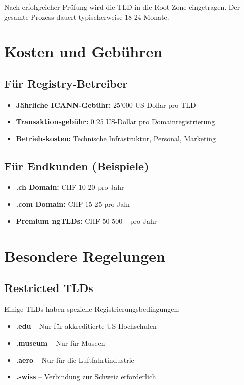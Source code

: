 \documentclass[
  nswissgerman,
  a4paper,
  DIV=11,
  numbers=noendperiod,
  ngerman]{scrreprt}
\providecommand{\tightlist}{%
  \setlength{\itemsep}{0pt}\setlength{\parskip}{0pt}}
\begin{document}
Nach erfolgreicher Prüfung wird die TLD in die Root Zone eingetragen.
Der gesamte Prozess dauert typischerweise 18-24 Monate.

\section{Kosten und Gebühren}\label{kosten-und-gebuxfchren}

\subsection{Für Registry-Betreiber}\label{fuxfcr-registry-betreiber}

\begin{itemize}
\tightlist
\item
  \textbf{Jährliche ICANN-Gebühr:} 25'000 US-Dollar pro TLD
\item
  \textbf{Transaktionsgebühr:} 0.25 US-Dollar pro Domainregistrierung
\item
  \textbf{Betriebskosten:} Technische Infrastruktur, Personal, Marketing
\end{itemize}

\subsection{Für Endkunden (Beispiele)}\label{fuxfcr-endkunden-beispiele}

\begin{itemize}
\tightlist
\item
  \textbf{.ch Domain:} CHF 10-20 pro Jahr
\item
  \textbf{.com Domain:} CHF 15-25 pro Jahr
\item
  \textbf{Premium ngTLDs:} CHF 50-500+ pro Jahr
\end{itemize}

\section{Besondere Regelungen}\label{besondere-regelungen}

\subsection{Restricted TLDs}\label{restricted-tlds}

Einige TLDs haben spezielle Registrierungsbedingungen:

\begin{itemize}
\tightlist
\item
  \textbf{.edu} -- Nur für akkreditierte US-Hochschulen
\item
  \textbf{.museum} -- Nur für Museen
\item
  \textbf{.aero} -- Nur für die Luftfahrtindustrie
\item
  \textbf{.swiss} -- Verbindung zur Schweiz erforderlich
\end{itemize}
\end{document}
